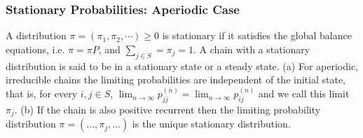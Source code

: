 \subsubsection*{Stationary Probabilities: Aperiodic Case}
 A distribution $\pi = (\pi_1,\pi_2,\cdots) \ge 0$ is stationary if it satisfies the global balance equations, i.e. $\pi = \pi P$, and $\sum_{j \in S} = \pi_j = 1$. A chain with a stationary distribution is said to be in a stationary state or a steady state.
(a) For aperiodic, irreducible chains the limiting probabilities are independent of the initial state, that is, for every $i, j \in S$, $\lim_{n \to \infty} p^{(n)}_{jj} = \lim_{n \to \infty} p^{(n)}_{ij}$ and we call this limit $\pi_j$. 
(b) If the chain is also positive recurrent then the limiting probability distribution $\pi = (\ldots, \pi_j, \ldots)$ is the unique stationary distribution.
